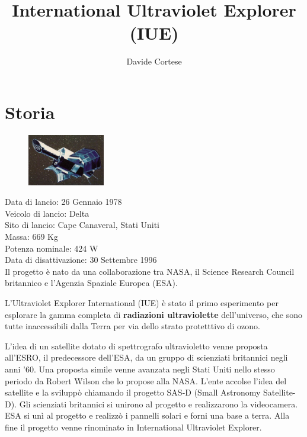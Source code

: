 \documentclass[12pt,a4paper]{article}
\begin{document}
\title{\vspace{-70pt}International Ultraviolet Explorer (IUE)}
\author{Davide Cortese}
\date{}
\maketitle
\pagestyle{empty}
\thispagestyle{empty}

\section*{Storia}
\label{storia}
\begin{figure}
  \vspace{-10pt}
  \begin{center}
    \includegraphics[width=0.30\textwidth]{satellite}
  \end{center}
  \vspace{-20pt}
\end{figure}
Data di lancio: 26 Gennaio 1978\\
Veicolo di lancio: Delta\\
Sito di lancio: Cape Canaveral, Stati Uniti\\
Massa: 669 Kg\\
Potenza nominale: 424 W\\
Data di disattivazione: 30 Settembre 1996\\

Il progetto è nato da una collaborazione tra NASA, il Science Research Council britannico e l'Agenzia Spaziale Europea (ESA).

L'Ultraviolet Explorer International (IUE) è stato il primo esperimento per esplorare la gamma completa di \textbf{radiazioni ultraviolette} dell'universo, che sono tutte inaccessibili dalla Terra per via dello strato protetttivo di ozono.

L'idea di un satellite dotato di spettrografo ultravioletto venne proposta all'ESRO, il predecessore dell'ESA, da un gruppo di scienziati britannici negli anni '60. Una proposta simile venne avanzata negli Stati Uniti nello stesso periodo da Robert Wilson che lo propose alla NASA. L'ente accolse l'idea del satellite e la sviluppò chiamando il progetto SAS-D (Small Astronomy Satellite-D). Gli scienziati britannici si unirono al progetto e realizzarono la videocamera. ESA si unì al progetto e realizzò i pannelli solari e forni una base a terra. Alla fine il progetto venne rinominato in International Ultraviolet Explorer.
\end{document}
